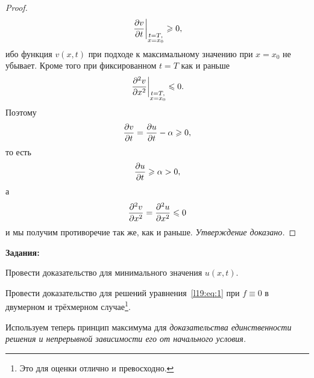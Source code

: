 \begin{proof}
	\begin{equation*}
		\displaystyle\left.\frac{\partial v}{\partial t}\right|_{\substack{t=T,\\ x=x_0}}\geqslant0,
	\end{equation*}
	ибо функция $v(x,t)$ при подходе к максимальному значению при $x=x_0$ не убывает. Кроме того при фиксированном $t=T$ как и раньше
	\begin{equation*}
		\displaystyle\left.\frac{\partial^2v}{\partial x^2}\right|_{\substack{t=T,\\ x=x_0}}\leqslant0.
	\end{equation*}
	Поэтому 
	\begin{equation*}
		\frac{\partial v}{\partial t}=\frac{\partial u}{\partial t}-\alpha\geqslant0,
	\end{equation*} 
	то есть 
	\begin{equation*}
		\frac{\partial u}{\partial t}\geqslant\alpha>0,
	\end{equation*}
	а 
	\begin{equation*}
		\frac{\partial^2v}{\partial x^2}=\frac{\partial^2u}{\partial x^2}\leqslant0
	\end{equation*}
	и мы получим противоречие так же, как и раньше. \emph{Утверждение доказано.}
\end{proof} 

\noindent\textbf{Задания:}
\begin{enumerateD}
	\item Провести доказательство для минимального значения $u(x,t)$.
	\item Провести доказательство для решений уравнения~\eqref{l19:eq:1} при $f\equiv0$ в двумерном и трёхмерном случае\footnote{Это для оценки отлично и превосходно.}.
\end{enumerateD}
\vspace{0.2cm}

Используем теперь принцип максимума для \emph{доказательства единственности решения и непрерывной зависимости его от начального условия.}

